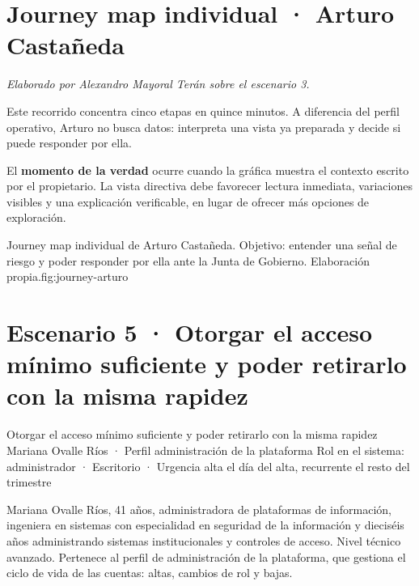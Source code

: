 \clearpage
\section{Journey map individual · Arturo Castañeda}

\textit{Elaborado por Alexandro Mayoral Terán sobre el escenario 3.}

Este recorrido concentra cinco etapas en quince minutos. A diferencia del perfil operativo,
Arturo no busca datos: interpreta una vista ya preparada y decide si puede responder por ella.

El \textbf{momento de la verdad} ocurre cuando la gráfica muestra el contexto escrito por el
propietario. La vista directiva debe favorecer lectura inmediata, variaciones visibles y una
explicación verificable, en lugar de ofrecer más opciones de exploración.

  {Journey map individual de Arturo Castañeda. Objetivo: entender una señal de riesgo y poder
   responder por ella ante la Junta de Gobierno. Elaboración propia.}{fig:journey-arturo}

\clearpage
{}

\section{Escenario 5 · Otorgar el acceso mínimo suficiente y poder retirarlo con la misma rapidez}

  {Otorgar el acceso mínimo suficiente y poder retirarlo con la misma rapidez}
  {Mariana Ovalle Ríos · Perfil administración de la plataforma}
  {Rol en el sistema: administrador · Escritorio · Urgencia alta el día del alta, recurrente el resto del trimestre}


Mariana Ovalle Ríos, 41 años, administradora de plataformas de información, ingeniera en
sistemas con especialidad en seguridad de la información y dieciséis años administrando
sistemas institucionales y controles de acceso. Nivel técnico avanzado. Pertenece al perfil de
administración de la plataforma, que gestiona el ciclo de vida de las cuentas: altas, cambios
de rol y bajas.

